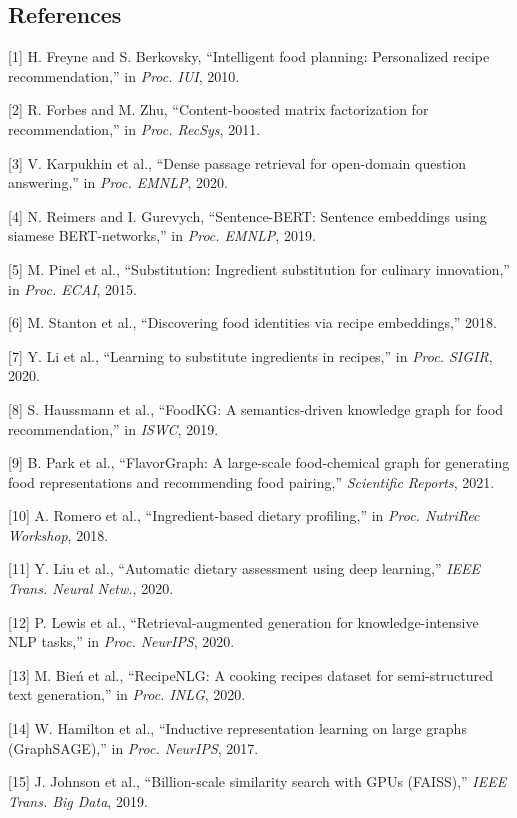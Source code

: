 \documentclass[
  10pt,
]{article}
\begin{document}
\subsection{References}\label{references}

{[}1{]} H. Freyne and S. Berkovsky, ``Intelligent food planning:
Personalized recipe recommendation,'' in \emph{Proc. IUI}, 2010.

{[}2{]} R. Forbes and M. Zhu, ``Content-boosted matrix factorization for
recommendation,'' in \emph{Proc. RecSys}, 2011.

{[}3{]} V. Karpukhin et al., ``Dense passage retrieval for open-domain
question answering,'' in \emph{Proc. EMNLP}, 2020.

{[}4{]} N. Reimers and I. Gurevych, ``Sentence-BERT: Sentence embeddings
using siamese BERT-networks,'' in \emph{Proc. EMNLP}, 2019.

{[}5{]} M. Pinel et al., ``Substitution: Ingredient substitution for
culinary innovation,'' in \emph{Proc. ECAI}, 2015.

{[}6{]} M. Stanton et al., ``Discovering food identities via recipe
embeddings,'' 2018.

{[}7{]} Y. Li et al., ``Learning to substitute ingredients in recipes,''
in \emph{Proc. SIGIR}, 2020.

{[}8{]} S. Haussmann et al., ``FoodKG: A semantics-driven knowledge
graph for food recommendation,'' in \emph{ISWC}, 2019.

{[}9{]} B. Park et al., ``FlavorGraph: A large-scale food-chemical graph
for generating food representations and recommending food pairing,''
\emph{Scientific Reports}, 2021.

{[}10{]} A. Romero et al., ``Ingredient-based dietary profiling,'' in
\emph{Proc. NutriRec Workshop}, 2018.

{[}11{]} Y. Liu et al., ``Automatic dietary assessment using deep
learning,'' \emph{IEEE Trans. Neural Netw.}, 2020.

{[}12{]} P. Lewis et al., ``Retrieval-augmented generation for
knowledge-intensive NLP tasks,'' in \emph{Proc. NeurIPS}, 2020.

{[}13{]} M. Bień et al., ``RecipeNLG: A cooking recipes dataset for
semi-structured text generation,'' in \emph{Proc. INLG}, 2020.

{[}14{]} W. Hamilton et al., ``Inductive representation learning on
large graphs (GraphSAGE),'' in \emph{Proc. NeurIPS}, 2017.

{[}15{]} J. Johnson et al., ``Billion-scale similarity search with GPUs
(FAISS),'' \emph{IEEE Trans. Big Data}, 2019.
\end{document}
